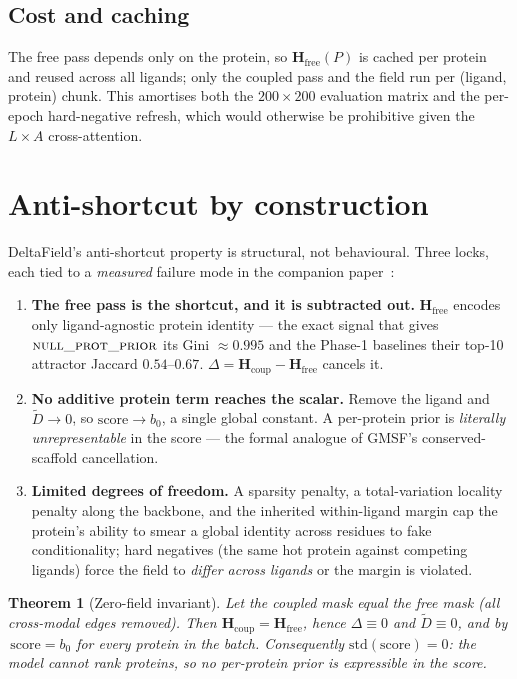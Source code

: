 \documentclass[11pt,a4paper]{article}
\newcommand{\df}{DeltaField\xspace}
\newcommand{\nullprior}{\textsc{null\_prot\_prior}\xspace}
\newcommand{\Hfree}{\mathbf{H}_{\text{free}}}
\newcommand{\Hcoup}{\mathbf{H}_{\text{coup}}}
\newtheorem{theorem}{Theorem}
\begin{document}
\subsection{Cost and caching}
The free pass depends only on the protein, so $\Hfree(P)$ is cached per
protein and reused across all ligands; only the coupled pass and the field run
per (ligand, protein) chunk. This amortises both the $200\times200$
evaluation matrix and the per-epoch hard-negative refresh, which would
otherwise be prohibitive given the $L\times A$ cross-attention.

\section{Anti-shortcut by construction}
\label{sec:antishortcut}

\df's anti-shortcut property is structural, not behavioural. Three locks,
each tied to a \emph{measured} failure mode in the companion
paper~\citep{manitz2026rankbind}:

\begin{enumerate}[leftmargin=*,itemsep=2pt,topsep=2pt]
  \item \textbf{The free pass is the shortcut, and it is subtracted out.}
        $\Hfree$ encodes only ligand-agnostic protein identity --- the exact
        signal that gives $\nullprior$ its Gini $\approx0.995$ and the
        Phase-1 baselines their top-10 attractor Jaccard $0.54$--$0.67$.
        $\Delta=\Hcoup-\Hfree$ cancels it.
  \item \textbf{No additive protein term reaches the scalar.} Remove the
        ligand and $\tilde{D}\to0$, so $\text{score}\to b_0$, a single global
        constant. A per-protein prior is \emph{literally unrepresentable} in
        the score --- the formal analogue of GMSF's conserved-scaffold
        cancellation.
  \item \textbf{Limited degrees of freedom.} A sparsity penalty, a
        total-variation locality penalty along the backbone, and the
        inherited within-ligand margin cap the protein's ability to smear a
        global identity across residues to fake conditionality; hard
        negatives (the same hot protein against competing ligands) force the
        field to \emph{differ across ligands} or the margin is violated.
\end{enumerate}

\begin{theorem}[Zero-field invariant]
\label{thm:zerofield}
Let the coupled mask equal the free mask (all cross-modal edges removed).
Then $\Hcoup=\Hfree$, hence $\Delta\equiv0$ and $\tilde{D}\equiv0$, and by
 $\,\mathrm{score}=b_0$ for every protein in the batch.
Consequently $\mathrm{std}(\mathrm{score})=0$: the model cannot rank proteins,
so no per-protein prior is expressible in the score.
\end{theorem}
\end{document}
